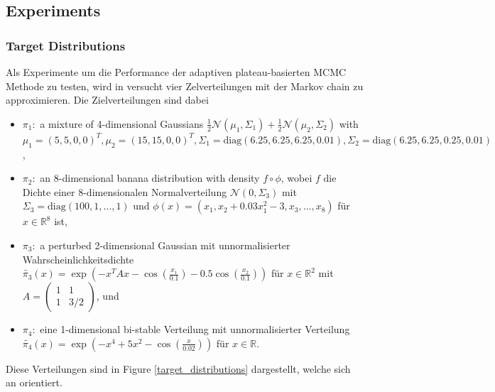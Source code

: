 \documentclass{scrartcl}
\begin{document}
    \subsection{Experiments}
    \subsubsection{Target Distributions}
    Als Experimente um die Performance der adaptiven plateau-basierten MCMC Methode zu testen, wird in \cite{lau2019} versucht vier Zelverteilungen
    mit der Markov chain zu approximieren. Die Zielverteilungen sind dabei
    \begin{itemize}
        \item $\pi_1:$ a mixture of 4-dimensional Gaussians $\frac12\mathcal{N}(\mu_1,\Sigma_1)+\frac12\mathcal{N}(\mu_2,\Sigma_2)$ with $\mu_1=(5,5,0,0)^T,\mu_2=(15,15,0,0)^T,\Sigma_1=\text{diag}(6.25,6.25,6.25,0.01),\Sigma_2=\text{diag}(6.25,6.25,0.25,0.01)$,
        \item $\pi_2:$ an 8-dimensional banana distribution with density $f\circ\phi$, wobei $f$ die Dichte einer 8-dimensionalen Normalverteilung $\mathcal{N}(0,\Sigma_3)$ mit $\Sigma_3=\text{diag}(100,1,\dots,1)$ und $\phi(x)=(x_1,x_2+0.03x_1^2-3,x_3,\dots,x_8)$ für $x\in\mathbb{R}^8$ ist,
        \item $\pi_3:$ a perturbed 2-dimensional Gaussian mit unnormalisierter Wahrscheinlichkeitsdichte $\tilde{\pi_3}(x)=\exp\left( -x^TAx-\cos\left( \frac{x_1}{0.1} \right) -0.5\cos\left( \frac{x_2}{0.1} \right) \right)$ für $x\in\mathbb{R}^2$ mit
        $A=\begin{pmatrix}
                    1 & 1\\
                    1 & 3/2
        \end{pmatrix}$, und
        \item $\pi_4:$ eine 1-dimensional bi-stable Verteilung mit unnormalisierter Verteilung $\tilde{\pi_4}(x)=\exp\left( -x^4+5x^2-\cos\left( \frac{x}{0.02} \right) \right)$ für $x\in\mathbb{R}$.
    \end{itemize}
    Diese Verteilungen sind in Figure \ref{target_distributions} dargestellt, welche sich an \cite[Figure 3]{lau2019} orientiert.
\end{document}
